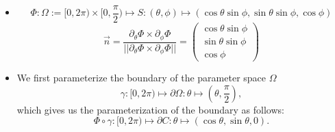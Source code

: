 \documentclass[11pt]{article}
\begin{document}
\begin{solution}     
    \begin{itemize}
    \item 
    $$
        \Phi: \Omega:= [0,2\pi)\times[0,\frac{\pi}{2}) \mapsto S: (\theta,\phi)\mapsto (\cos\theta\sin\phi,\sin\theta\sin\phi,\cos\phi) 
    $$
    $$
        \vec{n} = \frac{\partial_{\theta}\Phi\times \partial_{\phi}\Phi}{||\partial_{\theta}\Phi\times \partial_{\phi}\Phi||} = \begin{pmatrix}\cos\theta\sin\phi \\ \sin\theta\sin\phi\\ \cos\phi\end{pmatrix}
    $$

    \item 
    We first parameterize the boundary of the parameter space $\Omega$ 
    $$
        \gamma:[0,2\pi) \mapsto \partial \Omega : \theta \mapsto(\theta, \frac{\pi}{2}),
    $$
	which gives us the parameterization of the boundary as follows:
    $$
        \Phi\circ \gamma:[0,2\pi) \mapsto \partial C : \theta \mapsto(\cos\theta,\sin\theta,0).
    $$


\end{itemize}
\end{solution}
\end{document}
